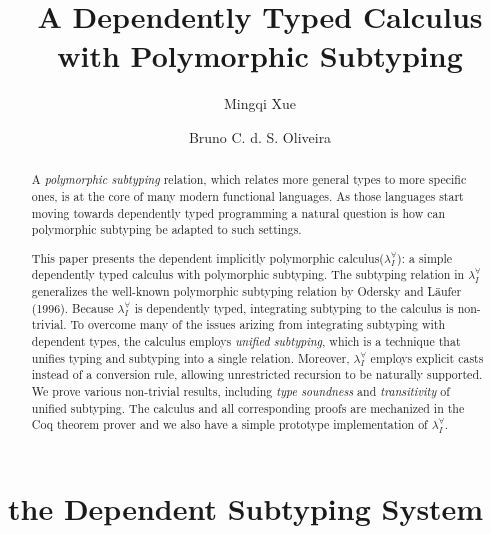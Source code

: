 \documentclass{llncs}
\newcommand{\system}[0]{the dependent implicitly polymorphic calculus\xspace}
\newcommand{\name}[0]{$\lambda_{I}^{\forall}$\xspace}
\begin{document}
\title{A Dependently Typed Calculus with Polymorphic Subtyping}

\author{Mingqi Xue \and Bruno C. d. S. Oliveira}

\maketitle

\begin{abstract}
  A \emph{polymorphic subtyping} relation, which relates more general types
  to more specific ones, is at the core of many modern functional languages.
  As those languages start moving towards dependently typed programming a
  natural question is how can polymorphic subtyping be adapted to such settings.
  
  This paper presents \system (\name): a simple dependently typed calculus
  with polymorphic subtyping. The subtyping relation in \name
  generalizes the well-known polymorphic subtyping relation by
  Odersky and L\"aufer (1996). Because \name is dependently typed,
  integrating subtyping to the calculus is non-trivial. To overcome
  many of the issues arizing from integrating subtyping with dependent
  types, the calculus employs \emph{unified subtyping}, which is a technique
  that unifies typing and subtyping into a single relation. Moreover, \name
  employs explicit casts instead of a conversion rule, allowing
  unrestricted recursion to be naturally supported.
  We prove various non-trivial results, including \emph{type soundness} and \emph{transitivity}
  of unified subtyping. The calculus and all corresponding proofs
  are mechanized in the Coq theorem prover and we also have a simple prototype
  implementation of \name.
\end{abstract}

\section{the Dependent Subtyping System}
\end{document}
